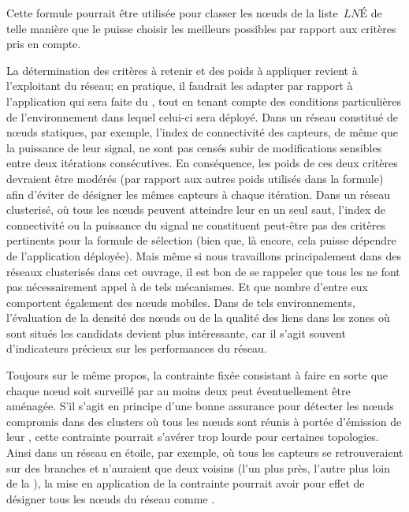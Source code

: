 Cette formule pourrait être utilisée pour classer les nœuds de la liste~$\mathit{LNÉ}$ de telle manière que le \ch puisse choisir les meilleurs \cns possibles par rapport aux critères pris en compte.

La détermination des critères à retenir et des poids à appliquer revient à l'exploitant du réseau; en pratique, il faudrait les adapter par rapport à l'application qui sera faite du \rc, tout en tenant compte des conditions particulières de l'environnement dans lequel celui-ci sera déployé.
Dans un réseau constitué de nœuds statiques, par exemple, l'index de connectivité des capteurs, de même que la puissance de leur signal, ne sont pas censés subir de modifications sensibles entre deux itérations consécutives.
En conséquence, les poids de ces deux critères devraient être modérés (par rapport aux autres poids utilisés dans la formule) afin d'éviter de désigner les mêmes capteurs à chaque itération.
Dans un réseau clusterisé, où tous les nœuds peuvent atteindre leur \CH en un seul saut, l'index de connectivité ou la puissance du signal ne constituent peut-être pas des critères pertinents pour la formule de sélection (bien que, là encore, cela puisse dépendre de l'application déployée).
Mais même si nous travaillons principalement dans des réseaux clusterisés dans cet ouvrage, il est bon de se rappeler que tous les \rcs ne font pas nécessairement appel à de tels mécanismes.
Et que nombre d'entre eux comportent également des nœuds mobiles.
Dans de tels environnements, l'évaluation de la densité des nœuds ou de la qualité des liens dans les zones où sont situés les \cns candidats devient plus intéressante, car il s'agit souvent d'indicateurs précieux sur les performances du réseau.

Toujours sur le même propos, la contrainte fixée consistant à faire en sorte que chaque nœud soit surveillé par au moins deux \cns peut éventuellement être aménagée.
S'il s'agit en principe d'une bonne assurance pour détecter les nœuds compromis dans des clusters où tous les nœuds sont réunis à portée d'émission de leur \ch, cette contrainte pourrait s'avérer trop lourde pour certaines topologies.
Ainsi dans un réseau en étoile, par exemple, où tous les capteurs se retrouveraient sur des branches et n'auraient que deux voisins (l'un plus près, l'autre plus loin de la \sdb), la mise en application de la contrainte pourrait avoir pour effet de désigner tous les nœuds du réseau comme \cns.

